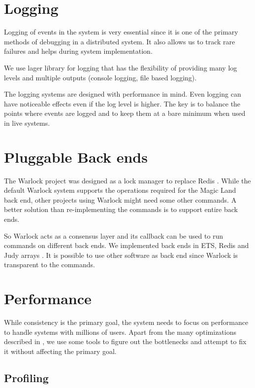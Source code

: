 \section{Logging}

Logging of events in the system is very essential since it is one of the primary
methods of debugging in a distributed system. It also allows us to track rare
failures and helps during system implementation.

We use lager \citep{lager} library for logging that has the flexibility of
providing many log levels%
and multiple outputs (console logging, file based logging).

The logging systems are designed with performance in mind. Even logging can have
noticeable effects even if the log level is higher. The key is to balance the
points where events are logged and to keep them at a bare minimum when used in
live systems.

\section{Pluggable Back ends}

The Warlock project was designed as a lock manager to replace Redis
\citep{redis}. While the default Warlock system supports the operations
required for the Magic Land back end, other projects using Warlock might need
some other commands. A better solution than re-implementing the commands is to
support entire back ends.

So Warlock acts as a consensus layer and its callback can be used to run
commands on different back ends. We implemented back ends in ETS, Redis and
Judy arrays \citep{judy}. It is possible to use other software as back end
since Warlock is transparent to the commands.

\section{Performance}

While consistency is the primary goal, the system needs to focus on performance
to handle systems with millions of users. Apart from the many optimizations
described in , we use some tools to figure out
the bottlenecks and attempt to fix it without affecting the primary goal.

\subsection{Profiling}
\label{section:impl.profiling}

